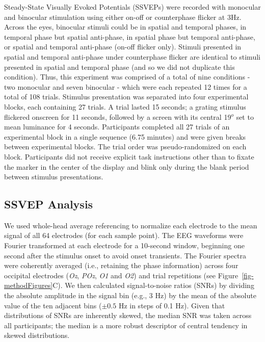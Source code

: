 \documentclass[
  12pt,
]{article}
\begin{document}
Steady-State Visually Evoked Potentials (SSVEPs) were recorded with
monocular and binocular stimulation using either on-off or counterphase
flicker at 3Hz. Across the eyes, binocular stimuli could be in spatial
and temporal phases, in temporal phase but spatial anti-phase, in
spatial phase but temporal anti-phase, or spatial and temporal
anti-phase (on-off flicker only). Stimuli presented in spatial and
temporal anti-phase under counterphase flicker are identical to stimuli
presented in spatial and temporal phase (and so we did not duplicate
this condition). Thus, this experiment was comprised of a total of nine
conditions - two monocular and seven binocular - which were each
repeated 12 times for a total of 108 trials. Stimulus presentation was
separated into four experimental blocks, each containing 27 trials. A
trial lasted 15 seconds; a grating stimulus flickered onscreen for 11
seconds, followed by a screen with its central 19\(^o\) set to mean
luminance for 4 seconds. Participants completed all 27 trials of an
experimental block in a single sequence (6.75 minutes) and were given
breaks between experimental blocks. The trial order was
pseudo-randomized on each block. Participants did not receive explicit
task instructions other than to fixate the marker in the center of the
display and blink only during the blank period between stimulus
presentations.

\subsection{SSVEP Analysis}\label{ssvep-analysis}

We used whole-head average referencing to normalize each electrode to
the mean signal of all 64 electrodes (for each sample point). The EEG
waveforms were Fourier transformed at each electrode for a 10-second
window, beginning one second after the stimulus onset to avoid onset
transients. The Fourier spectra were coherently averaged (i.e.,
retaining the phase information) across four occipital electrodes
(\emph{Oz}, \emph{POz}, \emph{O1} and \emph{O2}) and trial repetitions
(see Figure~\ref{fig-methodFigures}C). We then calculated
signal-to-noise ratios (SNRs) by dividing the absolute amplitude in the
signal bin (e.g., 3 Hz) by the mean of the absolute value of the ten
adjacent bins (\(\pm 0.5\) Hz in steps of 0.1 Hz). Given that
distributions of SNRs are inherently skewed, the median SNR was taken
across all participants; the median is a more robust descriptor of
central tendency in skewed distributions.
\end{document}
